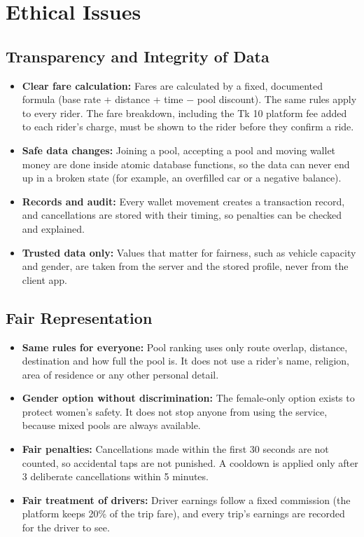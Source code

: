 \section{Ethical Issues}
\label{sec:ethical-issues}

\subsection{Transparency and Integrity of Data}

\begin{itemize}
  \item \textbf{Clear fare calculation:} Fares are calculated by a fixed,
        documented formula (base rate + distance + time $-$ pool discount).
        The same rules apply to every rider. The fare breakdown, including the
        Tk 10 platform fee added to each rider's charge, must be shown to the
        rider before they confirm a ride.
  \item \textbf{Safe data changes:} Joining a pool, accepting a pool and moving
        wallet money are done inside atomic database functions, so the data
        can never end up in a broken state (for example, an overfilled car or
        a negative balance).
  \item \textbf{Records and audit:} Every wallet movement creates a transaction
        record, and cancellations are stored with their timing, so penalties
        can be checked and explained.
  \item \textbf{Trusted data only:} Values that matter for fairness, such as
        vehicle capacity and gender, are taken from the server and the stored
        profile, never from the client app.
\end{itemize}

\subsection{Fair Representation}

\begin{itemize}
  \item \textbf{Same rules for everyone:} Pool ranking uses only route overlap,
        distance, destination and how full the pool is. It does not use a
        rider's name, religion, area of residence or any other personal detail.
  \item \textbf{Gender option without discrimination:} The female-only option
        exists to protect women's safety. It does not stop anyone from using
        the service, because mixed pools are always available.
  \item \textbf{Fair penalties:} Cancellations made within the first 30 seconds
        are not counted, so accidental taps are not punished. A cooldown is
        applied only after 3 deliberate cancellations within 5 minutes.
  \item \textbf{Fair treatment of drivers:} Driver earnings follow a fixed
        commission (the platform keeps 20\% of the trip fare), and every trip's
        earnings are recorded for the driver to see.
\end{itemize}

